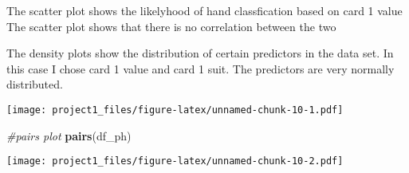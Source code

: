 \documentclass[]{article}
\newenvironment{Shaded}{\begin{snugshade}}{\end{snugshade}}
\newcommand{\KeywordTok}[1]{\textcolor[rgb]{0.13,0.29,0.53}{\textbf{#1}}}
\newcommand{\DataTypeTok}[1]{\textcolor[rgb]{0.13,0.29,0.53}{#1}}
\newcommand{\StringTok}[1]{\textcolor[rgb]{0.31,0.60,0.02}{#1}}
\newcommand{\CommentTok}[1]{\textcolor[rgb]{0.56,0.35,0.01}{\textit{#1}}}
\newcommand{\OperatorTok}[1]{\textcolor[rgb]{0.81,0.36,0.00}{\textbf{#1}}}
\newcommand{\NormalTok}[1]{#1}
\begin{document}
The scatter plot shows the likelyhood of hand classfication based on
card 1 value The scatter plot shows that there is no correlation between
the two

The density plots show the distribution of certain predictors in the
data set. In this case I chose card 1 value and card 1 suit. The
predictors are very normally distributed.

\begin{Shaded}
\end{Shaded}

\texttt{[image: project1\_files/figure-latex/unnamed-chunk-10-1.pdf]}

\begin{Shaded}
\begin{Highlighting}[]
\CommentTok{#pairs plot}
\KeywordTok{pairs}\NormalTok{(df_ph)}
\end{Highlighting}
\end{Shaded}

\texttt{[image: project1\_files/figure-latex/unnamed-chunk-10-2.pdf]}
\end{document}
